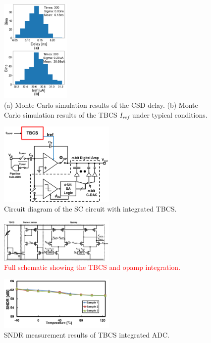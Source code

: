 \documentclass[paper]{ieice}
\begin{document}
\begin{figure}[!t]
\centering
 \includegraphics[width=0.3\textwidth]{figs/mc.png}
  \caption{(a) Monte-Carlo simulation results of the CSD delay. (b) Monte-Carlo simulation results of the TBCS $I_{ref}$ under typical conditions.
}
\label{monte}
\end{figure}

\begin{figure}[!t]
\centering
 \includegraphics[width=0.5\textwidth]{figs/switchcap.png}
  \caption{Circuit diagram of the SC circuit with integrated TBCS.}
\label{scap}
\end{figure}

\begin{figure}[!t]
\centering
 \includegraphics[width=0.5\textwidth]{figs/opamp.png}
  \caption{\textcolor{red}{Full schematic showing the TBCS and opamp integration.}}
\label{opamp}
\end{figure}

\begin{figure}[!t]
\centering
 \includegraphics[width=0.5\textwidth]{figs/sndr.png}
  \caption{SNDR measurement results of TBCS integrated ADC.}
\label{sndr}
\end{figure}
\end{document}
